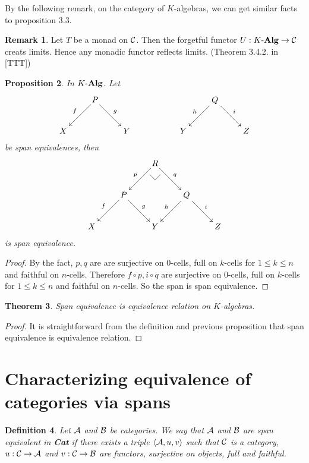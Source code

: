 \documentclass[12pt]{article}
\makeatletter
\theoremstyle{plain}
\newtheorem{theorem}{Theorem}[section]
\newtheorem{proposition}[theorem]{Proposition}
\newtheorem{definition}[theorem]{Definition}
\theoremstyle{definition}
\newtheorem{remark}[theorem]{Remark}
\newcommand{\pullbackmark}[2]{\save ;p+<.8pc,0pc>:(0,-1)::%
(#1) *{\phantom{Z}} %
;p+(#2)-(0,0) **@{-}%
;p-(#1)+(0,0) *{\phantom{Z}} **@{-} \restore}
\makeatother
\begin{document}
By the following remark, on the category of $K$-algebras, we can get similar facts to proposition 3.3.

\begin{remark}
Let $T$ be a monad on ${\cal C}$. Then the forgetful functor $U:K \mathchar`- {\bf Alg} \rightarrow {\cal C}$ creats limits. Hence any monadic functor reflects limits. (Theorem 3.4.2. in [TTT])
\end{remark} 


\begin{proposition}
In $K \mathchar`- {\bf Alg}$. Let
\[ \xymatrix{
 & \ar[ld]_f P \ar[rd]^g &  & & & \ar[ld]_h Q \ar[rd]^i & \\
X & & Y &  & Y & & Z 
} \]
be span equivalences, then
\[ \xymatrix{ 
 & & \ar[ld]_p R \pullbackmark{-1,1}{1,1} \ar[rd]^q & & \\
 & \ar[ld]_f P \ar[rd]^g &  & \ar[ld]_h Q \ar[rd]^i & \\
X & & Y & & Z 
} \]
is span equivalence.
\end{proposition}

\begin{proof}  By the fact, $p,q$ are are surjective on $0$-cells, full on $k$-cells for $1 \leq k \leq n$ and faithful on $n$-cells. Therefore $f \circ p , i \circ q$ are surjective on $0$-cells, full on $k$-cells for $1 \leq k \leq n$ and faithful on $n$-cells. So the span is span equivalence.
\end{proof}

\begin{theorem}
Span equivalence is equivalence relation on $K$-algebras.
\end{theorem}

\begin{proof} It is straightforward from the definition and previous proposition that span equivalence is equivalence relation.\end{proof}


\section{Characterizing equivalence of categories via spans}

\begin{definition}
Let ${\cal A}$ and ${\cal B}$ be categories. We say that ${\cal A}$ and ${\cal B}$ are \emph{span equivalent in {\bf Cat}} if there exists a triple $\langle {\cal A}, u, v \rangle$ such that ${\cal C}$ is a category, $u: {\cal C} \rightarrow {\cal A}$ and $v: {\cal C} \rightarrow {\cal B}$ are functors, surjective on objects, full and faithful.
\end{definition}
\end{document}
